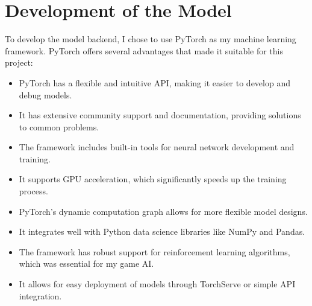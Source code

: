 \section{Development of the Model}

To develop the model backend, I chose to use PyTorch as my machine learning framework. PyTorch offers several advantages that made it suitable for this project:

\begin{itemize}
    \item PyTorch has a flexible and intuitive API, making it easier to develop and debug models.
    \item It has extensive community support and documentation, providing solutions to common problems.
    \item The framework includes built-in tools for neural network development and training.
    \item It supports GPU acceleration, which significantly speeds up the training process.
    \item PyTorch's dynamic computation graph allows for more flexible model designs.
    \item It integrates well with Python data science libraries like NumPy and Pandas.
    \item The framework has robust support for reinforcement learning algorithms, which was essential for my game AI.
    \item It allows for easy deployment of models through TorchServe or simple API integration.
\end{itemize}